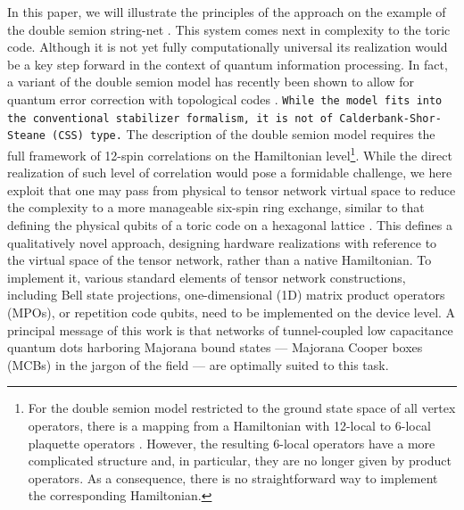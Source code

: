 \documentclass[twocolumn,floats,prx,showpacs]{revtex4-1}
\newcommand{\alex}[1]{{\color{alex} #1}}
\begin{document}
\alex{In this paper, we will illustrate the principles of the approach  on the example of the double semion string-net \cite{Levin2005}. This system comes next in complexity to the toric code. Although it is not yet fully computationally universal  its realization would be a key step forward in the context of quantum information processing. In fact, a variant of the double semion model has recently been shown to allow for quantum error correction with topological codes \cite{SemionErrorCorrection}.
\texttt{While the model fits into the conventional stabilizer formalism, it is not of Calderbank-Shor-Steane (CSS) type.} 
The description of the double semion model  requires the full framework of 12-spin correlations on the Hamiltonian level\footnote{\alex{For the double semion model restricted to the ground state space of all vertex operators, there is a mapping from a Hamiltonian with 12-local to 6-local plaquette operators \cite{SemionErrorCorrection}. However, the resulting 6-local operators have a more complicated structure and, in particular, they are no longer given by product operators. As a consequence, there is no straightforward way to implement the corresponding Hamiltonian.}}. While the direct realization of such level of correlation would pose a formidable challenge, we here exploit that one may pass from physical to tensor network virtual space to reduce the complexity to a more manageable six-spin ring exchange, similar to that defining the physical qubits of a toric code on a hexagonal lattice \cite{Vijay2015}. This defines a qualitatively novel approach, designing hardware realizations with reference to the virtual space of the tensor network, rather than a native Hamiltonian. To implement it, various standard elements of tensor network constructions, including  Bell state projections, one-dimensional (1D) matrix product operators (MPOs), or repetition code qubits, need to be implemented on the device level. A principal message of this work is that networks of tunnel-coupled low capacitance quantum dots harboring Majorana bound states  --- Majorana Cooper boxes (MCBs) in the jargon of the field \cite{Beri2012,Beri2013,Altland2013,Plugge2017,Karzig2017} --- are optimally suited to this task. }
\end{document}
